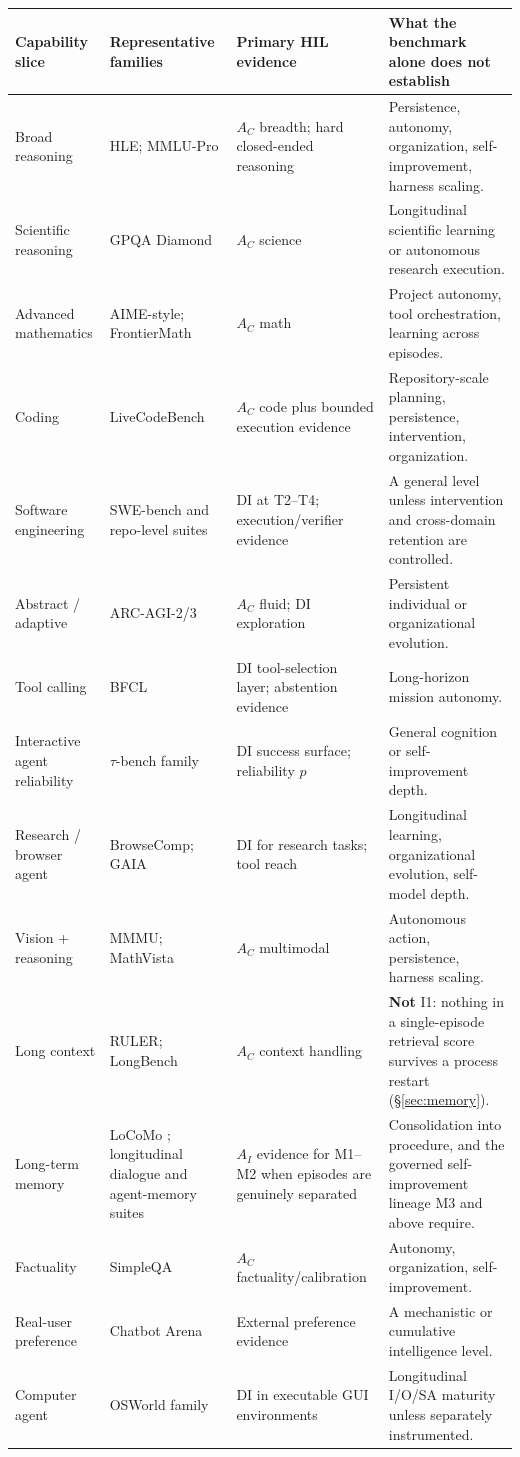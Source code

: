\documentclass[11pt]{article}
\theoremstyle{definition}
\begin{document}
\begin{table}[h]
\centering\scriptsize
\begin{tabularx}{\textwidth}{@{}lZZZ@{}}
\toprule
Capability slice & Representative families & Primary HIL evidence & What the benchmark alone does not establish \\
\midrule
Broad reasoning & HLE; MMLU-Pro & $A_C$ breadth; hard closed-ended reasoning & Persistence, autonomy, organization, self-improvement, harness scaling. \\
Scientific reasoning & GPQA Diamond & $A_C$ science & Longitudinal scientific learning or autonomous research execution. \\
Advanced mathematics & AIME-style; FrontierMath & $A_C$ math & Project autonomy, tool orchestration, learning across episodes. \\
Coding & LiveCodeBench & $A_C$ code plus bounded execution evidence & Repository-scale planning, persistence, intervention, organization. \\
Software engineering & SWE-bench and repo-level suites & DI at T2--T4; execution/verifier evidence & A general level unless intervention and cross-domain retention are controlled. \\
Abstract / adaptive & ARC-AGI-2/3 & $A_C$ fluid; DI exploration & Persistent individual or organizational evolution. \\
Tool calling & BFCL & DI tool-selection layer; abstention evidence & Long-horizon mission autonomy. \\
Interactive agent reliability & $\tau$-bench family & DI success surface; reliability $p$ & General cognition or self-improvement depth. \\
Research / browser agent & BrowseComp; GAIA & DI for research tasks; tool reach & Longitudinal learning, organizational evolution, self-model depth. \\
Vision + reasoning & MMMU; MathVista & $A_C$ multimodal & Autonomous action, persistence, harness scaling. \\
Long context & RULER; LongBench & $A_C$ context handling & \textbf{Not} I1: nothing in a single-episode retrieval score survives a process restart (\S\ref{sec:memory}). \\
Long-term memory & LoCoMo \citep{maharana2024locomo}; longitudinal dialogue and agent-memory suites & $A_I$ evidence for M1--M2 when episodes are genuinely separated & Consolidation into procedure, and the governed self-improvement lineage M3 and above require. \\
Factuality & SimpleQA & $A_C$ factuality/calibration & Autonomy, organization, self-improvement. \\
Real-user preference & Chatbot Arena & External preference evidence & A mechanistic or cumulative intelligence level. \\
Computer agent & OSWorld family & DI in executable GUI environments & Longitudinal I/O/SA maturity unless separately instrumented. \\
\bottomrule
\end{tabularx}
\end{table}
\end{document}
